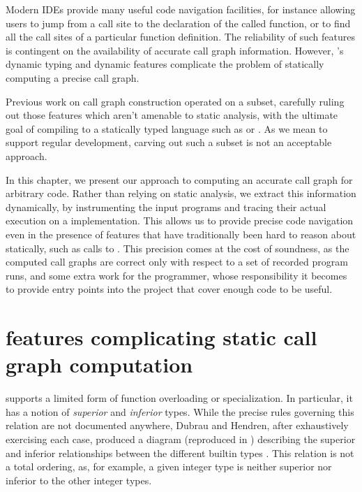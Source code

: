 Modern IDEs provide many useful code navigation facilities, for instance
allowing users to jump from a call site to the declaration of the called
function, or to find all the call sites of a particular function definition.
The reliability of such features is contingent on the availability of accurate
call graph information. However, \matlab's dynamic typing and dynamic features
complicate the problem of statically computing a precise call graph.

Previous work on \matlab call graph construction operated on a \matlab subset,
carefully ruling out those features which aren't amenable to static analysis,
with the ultimate goal of compiling \matlab to a statically typed language such
as \fortran or \xten \cite{Tamer}. As we mean to support regular \matlab
development, carving out such a subset is not an acceptable approach.

In this chapter, we present our approach to computing an accurate call graph
for arbitrary \matlab code. Rather than relying on static analysis, we extract
this information dynamically, by instrumenting the input programs and tracing
their actual execution on a \matlab implementation. This allows us to provide
precise code navigation even in the presence of features that have
traditionally been hard to reason about statically, such as calls to
. This precision comes at the cost of soundness, as the computed
call graphs are correct only with respect to a set of recorded program runs,
and some extra work for the programmer, whose responsibility it becomes to
provide entry points into the project that cover enough code to be useful.

\section{\matlab features complicating static call graph computation}

\matlab supports a limited form of function overloading or specialization. In
particular, it has a notion of \emph{superior} and \emph{inferior} types. While
the precise rules governing this relation are not documented anywhere, Dubrau
and Hendren, after exhaustively exercising each case, produced a diagram
(reproduced in ) describing the superior
and inferior relationships between the different builtin types \cite{Tamer}.
This relation is not a total ordering, as, for example, a given integer type is
neither superior nor inferior to the other integer types.


